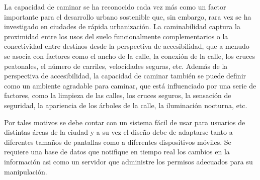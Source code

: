 La capacidad de caminar se ha reconocido cada vez más como un factor importante para el desarrollo urbano sostenible que, sin embargo, rara vez se ha investigado en ciudades de rápida urbanización. La caminabilidad captura la proximidad entre los usos del suelo funcionalmente complementarios o la conectividad entre destinos desde la perspectiva de accesibilidad, que a menudo se asocia con factores como el ancho de la calle, la conexión de la calle, los cruces peatonales, el número de carriles, velocidades seguras, etc. Además de la perspectiva de accesibilidad, la capacidad de caminar también se puede definir como un ambiente agradable para caminar, que está influenciado por una serie de factores, como la limpieza de las calles, los cruces seguros, la sensación de seguridad, la apariencia de los árboles de la calle, la iluminación nocturna, etc.
\vspace{0.8cm}

Por tales motivos se debe contar con un sistema fácil de usar para usuarios de distintas áreas de la ciudad y a su vez el diseño debe de adaptarse tanto a diferentes tamaños de pantallas como a diferentes dispositivos móviles. Se requiere una base de datos que notifique en tiempo real los cambios en la información asi como un servidor que administre los permisos adecuados para su manipulación.